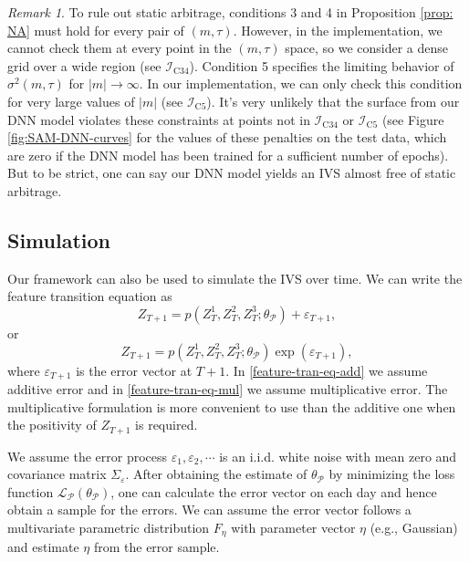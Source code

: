 \documentclass[11pt,a4paper]{article}
\theoremstyle{remark}
\newtheorem{remark}{Remark}
\begin{document}
\begin{remark}
	To rule out static arbitrage, conditions 3 and 4 in Proposition \ref{prop: NA} must hold for every pair of $(m,\tau)$. However, in the implementation, we cannot check them at every point in the $(m,\tau)$ space, so we consider a dense grid over a wide region (see $\mathcal{I}_{\mathrm{C} 34}$). Condition 5 specifies the limiting behavior of $\sigma^2(m,\tau)$ for $|m|\to\infty$. In our implementation, we can only check this condition for very large values of $|m|$ (see $\mathcal{I}_{\mathrm{C} 5}$). It's very unlikely that the surface from our DNN model violates these constraints at points not in $\mathcal{I}_{\mathrm{C} 34}$ or $\mathcal{I}_{\mathrm{C} 5}$ (see Figure \ref{fig:SAM-DNN-curves} for the values of these penalties on the test data, which are zero if the DNN model has been trained for a sufficient number of epochs). But to be strict, one can say our DNN model yields an IVS almost free of static arbitrage.
\end{remark}



\subsection{Simulation}
Our framework can also be used to simulate the IVS over time. We can write the feature transition equation as
\begin{equation}\label{feature-tran-eq-add}
	Z_{T+1}=p(Z^1_T,Z^2_T,Z^3_T;\theta_\mathcal{P}) + \varepsilon_{T+1},
\end{equation}
or 
\begin{equation}\label{feature-tran-eq-mul}
	Z_{T+1}=p(Z^1_T,Z^2_T,Z^3_T;\theta_\mathcal{P})\exp\left(\varepsilon_{T+1}\right) ,
\end{equation}
where $\varepsilon_{T+1}$ is the error vector at $T+1$. In 
\eqref{feature-tran-eq-add} we assume additive error and in \eqref{feature-tran-eq-mul} we assume multiplicative error. The multiplicative formulation is more convenient to use than the additive one when the positivity of $Z_{T+1}$ is required.

We assume the error process $\varepsilon_1, \varepsilon_2,\cdots$ is an i.i.d. white noise with mean zero and covariance matrix $\Sigma_{\varepsilon}$. After obtaining the estimate of $\theta_\mathcal{P}$ by minimizing the loss function $\mathcal{L}_{\mathcal{P}}(\theta_{\mathcal{P}})$, one can calculate the error vector on each day and hence obtain a sample for the errors. We can assume the error vector follows a multivariate parametric distribution $F_{\eta}$ with parameter vector $\eta$ (e.g., Gaussian) and estimate $\eta$ from the error sample. 
\end{document}
